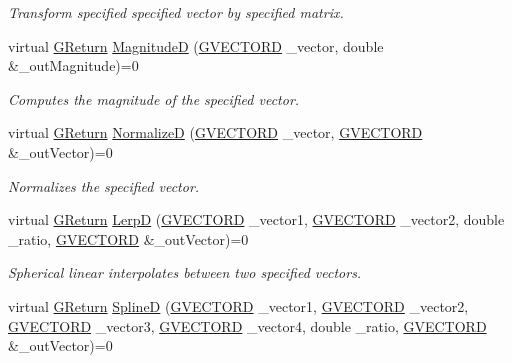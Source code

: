 \begin{DoxyCompactItemize}
\begin{DoxyCompactList}\small\item\em Transform specified specified vector by specified matrix. \end{DoxyCompactList}\item 
virtual \mbox{\hyperlink{namespace_g_w_a67a839e3df7ea8a5c5686613a7a3de21}{G\+Return}} \mbox{\hyperlink{class_g_w_1_1_m_a_t_h_1_1_g_vector_aa818487d161f4d66a27b3e1948623bdc}{MagnitudeD}} (\mbox{\hyperlink{struct_g_w_1_1_m_a_t_h_1_1_g_v_e_c_t_o_r_d}{G\+V\+E\+C\+T\+O\+RD}} \+\_\+vector, double \&\+\_\+out\+Magnitude)=0
\begin{DoxyCompactList}\small\item\em Computes the magnitude of the specified vector. \end{DoxyCompactList}\item 
virtual \mbox{\hyperlink{namespace_g_w_a67a839e3df7ea8a5c5686613a7a3de21}{G\+Return}} \mbox{\hyperlink{class_g_w_1_1_m_a_t_h_1_1_g_vector_a0f950e0db160053011d6aa0b5cf3159d}{NormalizeD}} (\mbox{\hyperlink{struct_g_w_1_1_m_a_t_h_1_1_g_v_e_c_t_o_r_d}{G\+V\+E\+C\+T\+O\+RD}} \+\_\+vector, \mbox{\hyperlink{struct_g_w_1_1_m_a_t_h_1_1_g_v_e_c_t_o_r_d}{G\+V\+E\+C\+T\+O\+RD}} \&\+\_\+out\+Vector)=0
\begin{DoxyCompactList}\small\item\em Normalizes the specified vector. \end{DoxyCompactList}\item 
virtual \mbox{\hyperlink{namespace_g_w_a67a839e3df7ea8a5c5686613a7a3de21}{G\+Return}} \mbox{\hyperlink{class_g_w_1_1_m_a_t_h_1_1_g_vector_ad5014f18d3986d46a6a7fd4828e5040e}{LerpD}} (\mbox{\hyperlink{struct_g_w_1_1_m_a_t_h_1_1_g_v_e_c_t_o_r_d}{G\+V\+E\+C\+T\+O\+RD}} \+\_\+vector1, \mbox{\hyperlink{struct_g_w_1_1_m_a_t_h_1_1_g_v_e_c_t_o_r_d}{G\+V\+E\+C\+T\+O\+RD}} \+\_\+vector2, double \+\_\+ratio, \mbox{\hyperlink{struct_g_w_1_1_m_a_t_h_1_1_g_v_e_c_t_o_r_d}{G\+V\+E\+C\+T\+O\+RD}} \&\+\_\+out\+Vector)=0
\begin{DoxyCompactList}\small\item\em Spherical linear interpolates between two specified vectors. \end{DoxyCompactList}\item 
virtual \mbox{\hyperlink{namespace_g_w_a67a839e3df7ea8a5c5686613a7a3de21}{G\+Return}} \mbox{\hyperlink{class_g_w_1_1_m_a_t_h_1_1_g_vector_ac585c33ea16033decc9de649d917ee8d}{SplineD}} (\mbox{\hyperlink{struct_g_w_1_1_m_a_t_h_1_1_g_v_e_c_t_o_r_d}{G\+V\+E\+C\+T\+O\+RD}} \+\_\+vector1, \mbox{\hyperlink{struct_g_w_1_1_m_a_t_h_1_1_g_v_e_c_t_o_r_d}{G\+V\+E\+C\+T\+O\+RD}} \+\_\+vector2, \mbox{\hyperlink{struct_g_w_1_1_m_a_t_h_1_1_g_v_e_c_t_o_r_d}{G\+V\+E\+C\+T\+O\+RD}} \+\_\+vector3, \mbox{\hyperlink{struct_g_w_1_1_m_a_t_h_1_1_g_v_e_c_t_o_r_d}{G\+V\+E\+C\+T\+O\+RD}} \+\_\+vector4, double \+\_\+ratio, \mbox{\hyperlink{struct_g_w_1_1_m_a_t_h_1_1_g_v_e_c_t_o_r_d}{G\+V\+E\+C\+T\+O\+RD}} \&\+\_\+out\+Vector)=0

\end{DoxyCompactItemize}
